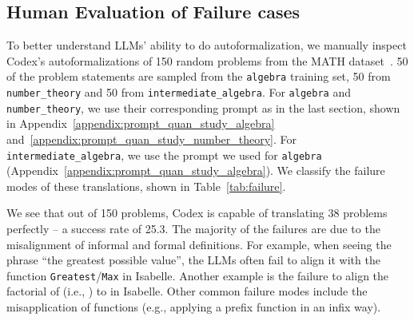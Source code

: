 \documentclass{article}
\begin{document}
\subsection{Human Evaluation of Failure cases}
\label{sec:failure_case}

To better understand LLMs' ability to do autoformalization, we manually inspect Codex's autoformalizations of 150 random problems from the MATH dataset~\citep{hendrycks2021math}. 50 of the problem statements are sampled from the \texttt{algebra} training set, 50 from \texttt{number\_theory} and 50 from \texttt{intermediate\_algebra}. For \texttt{algebra} and \texttt{number\_theory}, we use their corresponding prompt as in the last section, shown in Appendix~\ref{appendix:prompt_quan_study_algebra} and~\ref{appendix:prompt_quan_study_number_theory}. For \texttt{intermediate\_algebra}, we use the prompt we used for \texttt{algebra} (Appendix~\ref{appendix:prompt_quan_study_algebra}).  We classify the failure modes of these translations, shown in Table~\ref{tab:failure}. 

We see that out of 150 problems, Codex is capable of translating 38 problems perfectly -- a success rate of 25.3. The majority of the failures are due to the misalignment of informal and formal definitions. For example, when seeing the phrase ``the greatest possible value'', the LLMs often fail to align it with the function \texttt{Greatest}/\texttt{Max} in Isabelle. Another example is the failure to align the factorial of  (i.e., ) to  in Isabelle. Other common failure modes include the misapplication of functions (e.g., applying a prefix function in an infix way).
\end{document}
